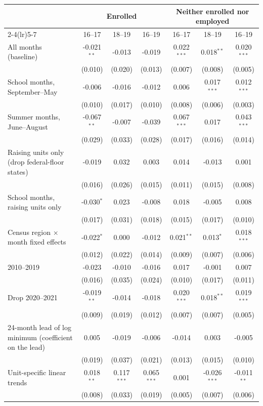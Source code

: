\begin{tabular}{lcccccc}
\toprule
 & \multicolumn{3}{c}{Enrolled} & \multicolumn{3}{c}{Neither enrolled nor employed} \\
\cmidrule(lr){2-4}\cmidrule(lr){5-7}
 & 16--17 & 18--19 & 16--19 & 16--17 & 18--19 & 16--19 \\
\midrule
All months (baseline) & -0.021$^{**}$ & -0.013 & -0.019 & 0.022$^{***}$ & 0.018$^{**}$ & 0.020$^{***}$ \\
 & (0.010) & (0.020) & (0.013) & (0.007) & (0.008) & (0.005) \\
School months, September--May & -0.006 & -0.016 & -0.012 & 0.006 & 0.017$^{***}$ & 0.012$^{***}$ \\
 & (0.010) & (0.017) & (0.010) & (0.008) & (0.006) & (0.003) \\
Summer months, June--August & -0.067$^{**}$ & -0.007 & -0.039 & 0.067$^{***}$ & 0.017 & 0.043$^{***}$ \\
 & (0.029) & (0.033) & (0.028) & (0.017) & (0.016) & (0.014) \\
Raising units only (drop federal-floor states) & -0.019 & 0.032 & 0.003 & 0.014 & -0.013 & 0.001 \\
 & (0.016) & (0.026) & (0.015) & (0.011) & (0.015) & (0.008) \\
School months, raising units only & -0.030$^{*}$ & 0.023 & -0.008 & 0.018 & -0.005 & 0.008 \\
 & (0.017) & (0.031) & (0.018) & (0.015) & (0.017) & (0.010) \\
Census region $\times$ month fixed effects & -0.022$^{*}$ & 0.000 & -0.012 & 0.021$^{**}$ & 0.013$^{*}$ & 0.018$^{***}$ \\
 & (0.012) & (0.022) & (0.014) & (0.009) & (0.007) & (0.006) \\
2010--2019 & -0.023 & -0.010 & -0.016 & 0.017 & -0.001 & 0.007 \\
 & (0.016) & (0.035) & (0.024) & (0.010) & (0.017) & (0.011) \\
Drop 2020--2021 & -0.019$^{**}$ & -0.014 & -0.018 & 0.020$^{***}$ & 0.018$^{**}$ & 0.019$^{***}$ \\
 & (0.009) & (0.019) & (0.012) & (0.007) & (0.007) & (0.005) \\
24-month lead of log minimum (coefficient on the lead) & 0.005 & -0.019 & -0.006 & -0.014 & 0.003 & -0.005 \\
 & (0.019) & (0.037) & (0.021) & (0.013) & (0.015) & (0.010) \\
Unit-specific linear trends & 0.018$^{**}$ & 0.117$^{***}$ & 0.065$^{***}$ & 0.001 & -0.026$^{***}$ & -0.011$^{**}$ \\
 & (0.008) & (0.033) & (0.019) & (0.005) & (0.007) & (0.006) \\
\bottomrule
\end{tabular}
